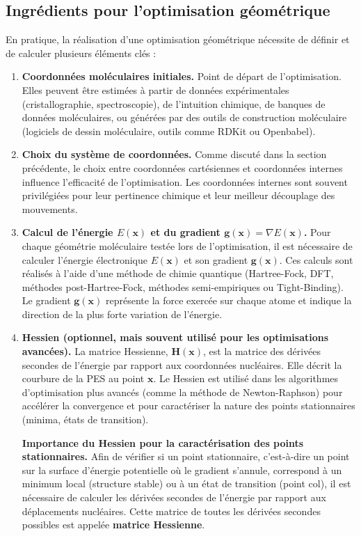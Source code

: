 \documentclass[12pt,a4paper]{article} %
\numberwithin{equation}{section} %
\numberwithin{figure}{section} %
\numberwithin{table}{section} %
\begin{document}
\subsection{Ingrédients pour l'optimisation géométrique}

En pratique, la réalisation d'une optimisation géométrique nécessite de définir et de calculer plusieurs éléments clés :
\begin{enumerate}
 \item \textbf{Coordonnées moléculaires initiales.} Point de départ de l'optimisation. Elles peuvent être estimées à partir de données expérimentales (cristallographie, spectroscopie), de l'intuition chimique, de banques de données moléculaires, ou générées par des outils de construction moléculaire (logiciels de dessin moléculaire, outils comme RDKit ou Openbabel).

 \item \textbf{Choix du système de coordonnées.} Comme discuté dans la section précédente, le choix entre coordonnées cartésiennes et coordonnées internes influence l'efficacité de l'optimisation. Les coordonnées internes sont souvent privilégiées pour leur pertinence chimique et leur meilleur découplage des mouvements.

 \item \textbf{Calcul de l'énergie $E(\mathbf{x})$ et du gradient $\mathbf{g}(\mathbf{x}) = \nabla E(\mathbf{x})$.} Pour chaque géométrie moléculaire testée lors de l'optimisation, il est nécessaire de calculer l'énergie électronique $E(\mathbf{x})$ et son gradient $\mathbf{g}(\mathbf{x})$. Ces calculs sont réalisés à l'aide d'une méthode de chimie quantique (Hartree-Fock, DFT, méthodes post-Hartree-Fock, méthodes semi-empiriques ou Tight-Binding). Le gradient $\mathbf{g}(\mathbf{x})$ représente la force exercée sur chaque atome et indique la direction de la plus forte variation de l'énergie.

 \item \textbf{Hessien (optionnel, mais souvent utilisé pour les optimisations avancées).} La matrice Hessienne, $\mathbf{H}(\mathbf{x})$, est la matrice des dérivées secondes de l'énergie par rapport aux coordonnées nucléaires. Elle décrit la courbure de la PES au point $\mathbf{x}$. Le Hessien est utilisé dans les algorithmes d'optimisation plus avancés (comme la méthode de Newton-Raphson) pour accélérer la convergence et pour caractériser la nature des points stationnaires (minima, états de transition).
 
  \textbf{Importance du Hessien pour la caractérisation des points stationnaires.} Afin de vérifier si un point stationnaire, c'est-à-dire un point sur la surface d'énergie potentielle où le gradient s'annule, correspond à un minimum local (structure stable) ou à un état de transition (point col), il est nécessaire de calculer les dérivées secondes de l'énergie par rapport aux déplacements nucléaires. Cette matrice de toutes les dérivées secondes possibles est appelée \textbf{matrice Hessienne}.


\end{enumerate}
\end{document}
